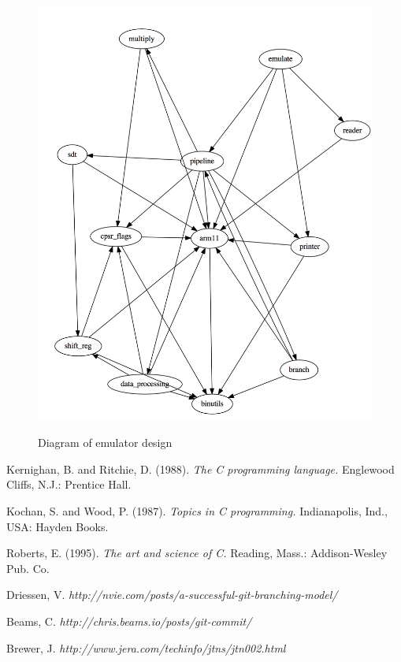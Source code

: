 \documentclass[11pt]{article}
\begin{document}
\medskip

\begin{figure}[h]
\caption{Diagram of emulator design}
\centering
\includegraphics[scale=0.7]{arm11-modules.png}
\label{fig:arm11}
\end{figure}

\begin{thebibliography}{7}

Kernighan, B. and Ritchie, D. (1988).
\textit{The C programming language.}
Englewood Cliffs, N.J.: Prentice Hall.

Kochan, S. and Wood, P. (1987).
\textit{Topics in C programming.}
Indianapolis, Ind., USA: Hayden Books.
 
Roberts, E. (1995).
\textit{The art and science of C.}
Reading, Mass.: Addison-Wesley Pub. Co.

Driessen, V.
\textit{http://nvie.com/posts/a-successful-git-branching-model/}

Beams, C.
\textit{http://chris.beams.io/posts/git-commit/}

Brewer, J.
\textit{http://www.jera.com/techinfo/jtns/jtn002.html}

\end{thebibliography}
\end{document}
